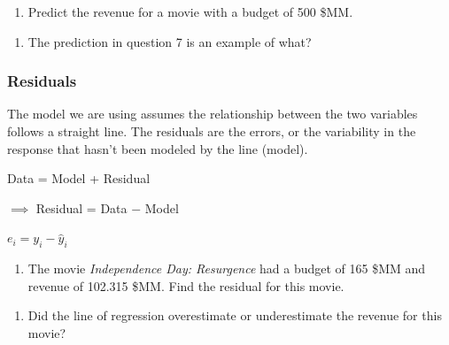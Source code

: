 \documentclass[
]{report}
\providecommand{\tightlist}{%
  \setlength{\itemsep}{0pt}\setlength{\parskip}{0pt}}
\begin{document}
\vspace{.6in}

\begin{enumerate}
\def\labelenumi{\arabic{enumi}.}
\setcounter{enumi}{6}
\tightlist
\item
  Predict the revenue for a movie with a budget of 500 \$MM.
\end{enumerate}

\vspace{0.8in}

\begin{enumerate}
\def\labelenumi{\arabic{enumi}.}
\setcounter{enumi}{7}
\tightlist
\item
  The prediction in question 7 is an example of what?
\end{enumerate}

\vspace{0.3in}

\hypertarget{residuals}{%
\subsubsection*{Residuals}\label{residuals}}

The model we are using assumes the relationship between the two variables follows a straight line. The residuals are the errors, or the variability in the response that hasn't been modeled by the line (model).

\begin{center}
Data = Model + Residual

$\implies$ Residual = Data $-$ Model

$e_i=y_i-\hat{y}_i$
\end{center}

\begin{enumerate}
\def\labelenumi{\arabic{enumi}.}
\setcounter{enumi}{8}
\tightlist
\item
  The movie \emph{Independence Day: Resurgence} had a budget of 165 \$MM and revenue of 102.315 \$MM. Find the residual for this movie.
\end{enumerate}

\vspace{.8in}

\begin{enumerate}
\def\labelenumi{\arabic{enumi}.}
\setcounter{enumi}{9}
\tightlist
\item
  Did the line of regression overestimate or underestimate the revenue for this movie?
\end{enumerate}
\end{document}
